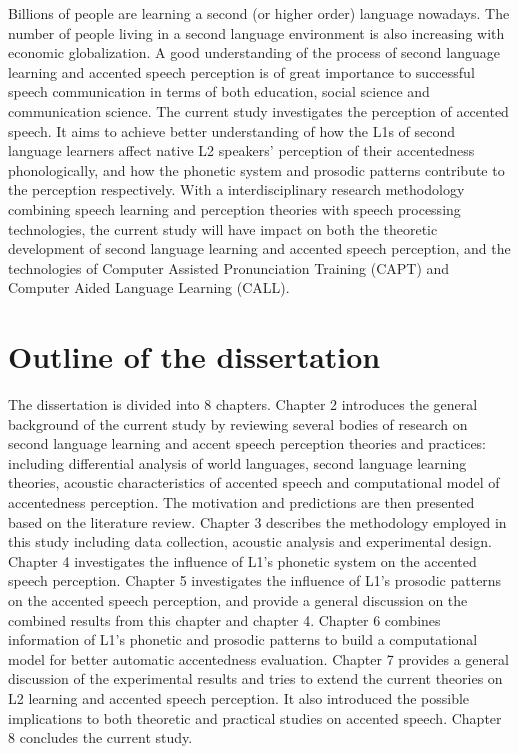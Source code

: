 Billions of people are learning a second (or higher order) language nowadays. The number of people living in a second language environment is also increasing with economic globalization. A good understanding of the process of second language learning and accented speech perception is of great importance to successful speech communication in terms of both education, social science and communication science. The current study investigates the perception of accented speech. It aims to achieve better understanding of how the L1s of second language learners affect native L2 speakers' perception of their accentedness phonologically, and how the phonetic system and prosodic patterns contribute to the perception respectively. With a interdisciplinary research methodology combining speech learning and perception theories with speech processing technologies, the current study will have impact on both the theoretic development of second language learning and accented speech perception, and the technologies of Computer Assisted Pronunciation Training (CAPT) and Computer Aided Language Learning (CALL).

\section{Outline of the dissertation}

The dissertation is divided into 8 chapters. Chapter 2 introduces the general background of the current study by reviewing several bodies of research on second language learning and accent speech perception theories and practices: including differential analysis of world languages, second language learning theories, acoustic characteristics of accented speech and computational model of accentedness perception. The motivation and predictions are then presented based on the literature review. Chapter 3 describes the methodology employed in this study including data collection, acoustic analysis and experimental design. Chapter 4 investigates the influence of L1's phonetic system on the accented speech perception. Chapter 5 investigates the influence of L1's prosodic patterns on the accented speech perception, and provide a general discussion on the combined results from this chapter and chapter 4. Chapter 6 combines information of L1's phonetic and prosodic patterns to build a computational model for better automatic accentedness evaluation. Chapter 7 provides a general discussion of the experimental results and tries to extend the current theories on L2 learning and accented speech perception. It also introduced the possible implications to both theoretic and practical studies on accented speech. Chapter 8 concludes the current study.



